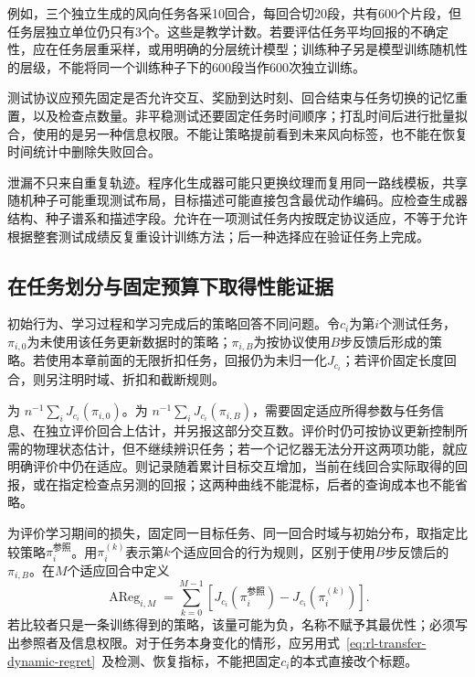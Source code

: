例如，三个独立生成的风向任务各采10回合，每回合切20段，共有600个片段，但任务层独立单位仍只有3个。这些是教学计数。若要评估任务平均回报的不确定性，应在任务层重采样，或用明确的分层统计模型；训练种子另是模型训练随机性的层级，不能将同一个训练种子下的600段当作600次独立训练。

测试协议应预先固定是否允许交互、奖励到达时刻、回合结束与任务切换的记忆重置，以及检查点数量。非平稳测试还要固定任务时间顺序；打乱时间后进行批量拟合，使用的是另一种信息权限。不能让策略提前看到未来风向标签，也不能在恢复时间统计中删除失败回合。

泄漏不只来自重复轨迹。程序化生成器可能只更换纹理而复用同一路线模板，共享随机种子可能重现测试布局，目标描述可能直接包含最优动作编码。应检查生成器结构、种子谱系和描述字段。允许在一项测试任务内按既定协议适应，不等于允许根据整套测试成绩反复重设计训练方法；后一种选择应在验证任务上完成。

\subsection{在任务划分与固定预算下取得性能证据}
\label{sec:rl-transfer-evidence}

初始行为、学习过程和学习完成后的策略回答不同问题。令$c_i$为第$i$个测试任务，$\pi_{i,0}$为未使用该任务更新数据时的策略；$\pi_{i,B}$为按协议使用$B$步反馈后形成的策略。若使用本章前面的无限折扣任务，回报仍为未归一化$J_{c_i}$；若评价固定长度回合，则另注明时域、折扣和截断规则。

为
$n^{-1}\sum_iJ_{c_i}(\pi_{i,0})$。为
$n^{-1}\sum_iJ_{c_i}(\pi_{i,B})$，需要固定适应所得参数与任务信息、在独立评价回合上估计，并另报这部分交互数。评价时仍可按协议更新控制所需的物理状态估计，但不继续辨识任务；若一个记忆器无法分开这两项功能，就应明确评价中仍在适应。则记录随着累计目标交互增加，当前在线回合实际取得的回报，或在指定检查点另测的回报；这两种曲线不能混标，后者的查询成本也不能省略。

为评价学习期间的损失，固定同一目标任务、同一回合时域与初始分布，取指定比较策略$\pi_i^{\text{参照}}$。用$\pi_i^{(k)}$表示第$k$个适应回合的行为规则，区别于使用$B$步反馈后的$\pi_{i,B}$。在$M$个适应回合中定义
\begin{equation}
 \operatorname{AReg}_{i,M}
 =\sum_{k=0}^{M-1}
 \left[J_{c_i}(\pi_i^{\text{参照}})
       -J_{c_i}(\pi_i^{(k)})\right].
 \label{eq:rl-transfer-adaptation-regret}
\end{equation}
若比较者只是一条训练得到的策略，该量可能为负，名称不赋予其最优性；必须写出参照者及信息权限。对于任务本身变化的情形，应另用式~\eqref{eq:rl-transfer-dynamic-regret}~及检测、恢复指标，不能把固定$c_i$的本式直接改个标题。

